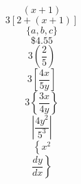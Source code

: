 \documentclass[12pt]{article}
\begin{document}
	$$(x+1)$$
	$$3[2+(x+1)]$$
	$$\{a,b,c\}$$
	$$\$4.55$$
	$$3\left(\frac{2}{5}\right)$$
	$$3\left[\frac{4x}{5y}\right]$$
	$$3\left\{\frac{3x}{4y}\right\}$$
	$$\left|\frac{4y^2}{5^3}\right|$$
	$$\left\{x^2\right.$$
	$$\left.\frac{dy}{dx}\right\}$$
\end{document}
